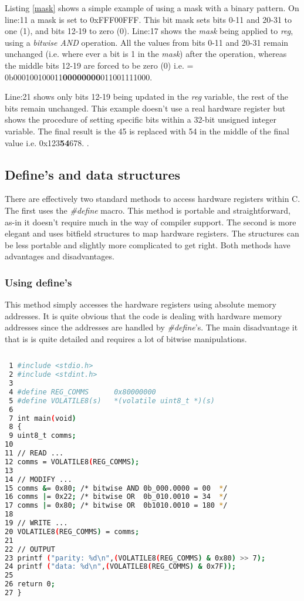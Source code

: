 Listing \ref{mask} shows a simple example of using a mask with a binary pattern. On line:11 a mask is set to 0xFFF00FFF. This bit mask sets bits 0-11 and 20-31 to one (1), and bits 12-19 to zero (0). Line:17 shows the \textit{mask} being applied to \textit{reg}, using a \textit{bitwise AND} operation. All the values from bits 0-11 and 20-31 remain unchanged (i.e. where ever a bit is 1 in the \textit{mask}) after the operation, whereas the middle bits 12-19 are forced to be zero (0) i.e. = 0b000100100011\textbf{00000000}011001111000. 

Line:21 shows only bits 12-19 being updated in the \textit{reg} variable, the rest of the bits remain unchanged. This example doesn't use a real hardware register but shows the procedure of setting specific bits within a 32-bit unsigned integer variable. The final result is the 45 is replaced with 54 in the middle of the final value i.e. 0x123\textbf{54}678.  .

\subsection{Define's and data structures}

There are effectively two standard methods to access hardware registers within C. The first uses the \textit{\#define} macro. This method is portable and straightforward, as-in it doesn't require much in the way of compiler support. The second is more elegant and uses bitfield structures to map hardware registers. The structures can be less portable and slightly more complicated to get right. Both methods have advantages and disadvantages.

\subsubsection{Using define's}

This method simply accesses the hardware registers using absolute memory addresses. It is quite obvious that the code is dealing with hardware memory addresses since the addresses are handled by \textit{\#define}'s. The main disadvantage it that is is quite detailed and requires a lot of bitwise manipulations.

\begin{lstlisting}[language=bash,showstringspaces=false,caption={File: volhwreg.c},captionpos=b,label=rawaccess]
	
 1 #include <stdio.h>
 2 #include <stdint.h>
 3 
 4 #define REG_COMMS      0x80000000
 5 #define VOLATILE8(s)   *(volatile uint8_t *)(s)
 6 
 7 int main(void)
 8 {    
 9 uint8_t comms;
10 
11 // READ ...
12 comms = VOLATILE8(REG_COMMS); 
13 
14 // MODIFY ...
15 comms &= 0x80; /* bitwise AND 0b_000.0000 = 00  */
16 comms |= 0x22; /* bitwise OR  0b_010.0010 = 34  */ 
17 comms |= 0x80; /* bitwise OR  0b1010.0010 = 180 */
18 
19 // WRITE ...
20 VOLATILE8(REG_COMMS) = comms;
21 
22 // OUTPUT
23 printf ("parity: %d\n",(VOLATILE8(REG_COMMS) & 0x80) >> 7);
24 printf ("data: %d\n",(VOLATILE8(REG_COMMS) & 0x7F));
25 
26 return 0;
27 }

\end{lstlisting}

